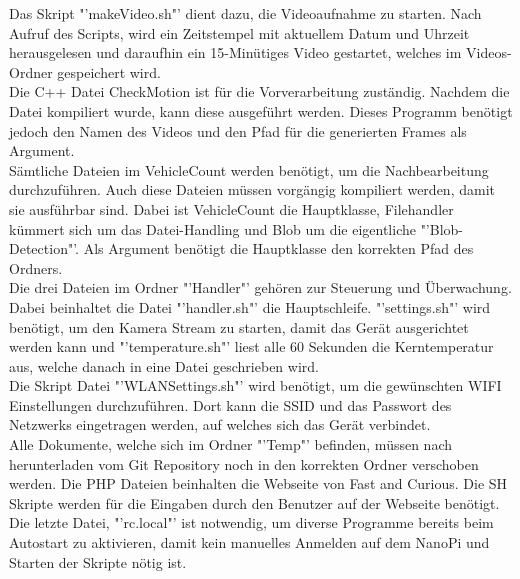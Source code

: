 Das Skript "'makeVideo.sh"' dient dazu, die Videoaufnahme zu starten. Nach Aufruf des Scripts, wird ein Zeitstempel mit aktuellem Datum und Uhrzeit herausgelesen und daraufhin ein 15-Minütiges Video gestartet, welches im Videos-Ordner gespeichert wird.\\

Die C++ Datei CheckMotion ist für die Vorverarbeitung zuständig. Nachdem die Datei kompiliert wurde, kann diese ausgeführt werden. Dieses Programm benötigt jedoch den Namen des Videos und den Pfad für die generierten Frames als Argument.\\

Sämtliche Dateien im VehicleCount werden benötigt, um die Nachbearbeitung durchzuführen. Auch diese Dateien müssen vorgängig kompiliert werden, damit sie ausführbar sind. Dabei ist VehicleCount die Hauptklasse, Filehandler kümmert sich um das Datei-Handling und Blob um die eigentliche "'Blob-Detection"'. Als Argument benötigt die Hauptklasse den korrekten Pfad des Ordners.\\

Die drei Dateien im Ordner "'Handler"' gehören zur Steuerung und Überwachung. Dabei beinhaltet die Datei "'handler.sh"' die Hauptschleife. "'settings.sh"' wird benötigt, um den Kamera Stream zu starten, damit das Gerät ausgerichtet werden kann und "'temperature.sh"' liest alle 60 Sekunden die Kerntemperatur aus, welche danach in eine Datei geschrieben wird.\\

Die Skript Datei "'WLANSettings.sh"' wird benötigt, um die gewünschten WIFI Einstellungen durchzuführen. Dort kann die SSID und das Passwort des Netzwerks eingetragen werden, auf welches sich das Gerät verbindet.\\

Alle Dokumente, welche sich im Ordner "'Temp"' befinden, müssen nach herunterladen vom Git Repository noch in den korrekten Ordner verschoben werden. Die PHP Dateien beinhalten die Webseite von Fast and Curious. Die SH Skripte werden für die Eingaben durch den Benutzer auf der Webseite benötigt. Die letzte Datei, "'rc.local"' ist notwendig, um diverse Programme bereits beim Autostart zu aktivieren, damit kein manuelles Anmelden auf dem NanoPi und Starten der Skripte nötig ist.\\

